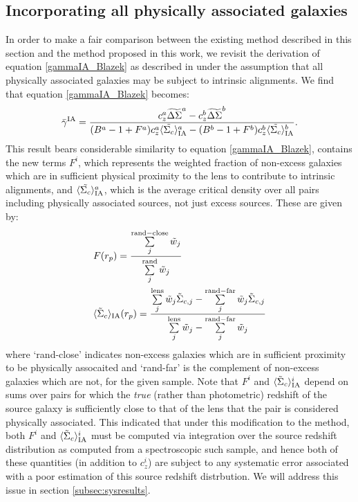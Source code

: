 \documentclass[a4paper,fleqn,usenatbib,useAMS]{mnras}
\begin{document}
\subsection{Incorporating all physically associated galaxies}
\label{subsec:notjustexcess}
\noindent
In order to make a fair comparison between the existing method described in this section and the method proposed in this work, we revisit the derivation of equation \ref{gammaIA_Blazek} as described in \cite{Blazek2012} under the assumption that all physically associated galaxies may be subject to intrinsic alignments. We find that equation \ref{gammaIA_Blazek} becomes:
\begin{equation}
\bar{\gamma}^{\rm IA} = \frac{c_z^a \widetilde{\Delta\Sigma}^a - c_z^b \widetilde{\Delta\Sigma}^b}{(B^a-1+F^a)c_z^a \langle \tilde{\Sigma_c}\rangle_{\rm IA}^a -(B^b-1+F^b)c_z^b \langle \tilde{\Sigma_c}\rangle_{\rm IA}^b}.
\label{gammaIA_allphys}
\end{equation}
This result bears considerable similarity to equation \ref{gammaIA_Blazek}, contains the new terms $F^i$, which represents the weighted fraction of non-excess galaxies which are in sufficient physical proximity to the lens to contribute to intrinsic alignments, and $\langle \tilde{\Sigma_c}\rangle_{\rm IA}^a$, which is the average critical density over all pairs including physically associated sources, not just excess sources. These are given by:
\begin{align}
&F(r_p)= \frac{\sum\limits_{j}^{\rm rand-close}\tilde{w}_j}{\sum\limits_{j}^{\rm rand} \tilde{w}_j}  \label{F} \\
&\langle \tilde{\Sigma}_c\rangle_{\rm IA} (r_p) =  \frac{\sum\limits_{j}^{\rm lens} \tilde{w}_j \tilde{\Sigma}_{c,j}- \sum\limits_{j}^{\rm rand-far} \tilde{w}_j \tilde{\Sigma}_{c,j}}{\sum\limits_{j}^{\rm lens} \tilde{w}_j - \sum\limits_{j}^{\rm rand-far} \tilde{w}_j}\label{SigIA}
\end{align}
where `rand-close' indicates non-excess galaxies which are in sufficient proximity to be physically assocaited and `rand-far' is the complement of non-excess galaxies which are not, for the given sample. Note that $F^i$ and $\langle \tilde{\Sigma}_c\rangle_{\rm IA}^i$ depend on sums over pairs for which the {\it true} (rather than photometric) redshift of the source galaxy is sufficiently close to that of the lens that the pair is considered physically associated. This indicated that under this modification to the \cite{Blazek2012} method, both $F^i$ and $\langle \tilde{\Sigma}_c\rangle_{\rm IA}^i$ must be computed via integration over the source redshift distribution as computed from a spectroscopic such sample, and hence both of these quantities (in addition to $c_z^i$) are subject to any systematic error associated with a poor estimation of this source redshift distrbution. We will address this issue in section \ref{subsec:sysresults}.
\end{document}
